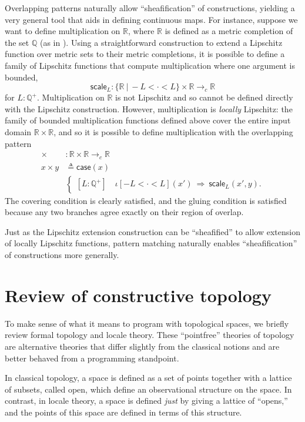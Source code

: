 \documentclass[conference]{IEEEtran}
\newcommand{\cto}{\to_c}
\newcommand{\R}{\mathbb{R}}
\newcommand{\rat}{\mathbb{Q}}
\newcommand{\suchthat}{\ |\ }
\newcommand{\oinclf}[1]{\iota[{#1}]}
\newcommand{\oincl}[2]{\oinclf{#1} \left({#2}\right)}
\newcommand{\Branch}{\Rightarrow}
\begin{document}
Overlapping patterns naturally allow ``sheafification'' of constructions, yielding a very general tool that aids in defining continuous maps. For instance, suppose we want to define multiplication on $\R$, where $\R$ is defined as a metric completion of the set $\rat$ (as in \cite{vickersmetric}). Using a straightforward construction to extend a Lipschitz function over metric sets to their metric completions, it is possible to define a family of Lipschitz functions that compute multiplication where one argument is bounded,
\[
\mathsf{scale}_L : \{ \R \suchthat -L < \cdot < L \} \times \R \cto \R
\]
for $L : \rat^+$. Multiplication on $\R$ is not Lipschitz and so cannot be defined directly with the Lipschitz construction. However, multiplication is \emph{locally} Lipschitz: the family of bounded multiplication functions defined above cover the entire input domain $\R \times \R$, and so it is possible to define multiplication with the overlapping pattern
\begin{align*}
\times &: \R \times \R \cto \R
\\ x \times y &\triangleq
\mathsf{case}(x)
\\
&\begin{cases}
[L : \rat^+] \quad \oincl{-L < \cdot < L}{x'}  \  \Branch \  \mathsf{scale}_L(x', y).
\end{cases}
\end{align*}
The covering condition is clearly satisfied, and the gluing condition is satisfied because any two branches agree exactly on their region of overlap.

Just as the Lipschitz extension construction can be ``sheafified'' to allow extension of locally Lipschitz functions, pattern matching naturally enables ``sheafification'' of constructions more generally.

\section{Review of constructive topology}
\label{s:topology}

To make sense of what it means to program with topological spaces, we briefly review formal topology and locale theory. These ``pointfree'' theories of topology are alternative theories that differ slightly from the classical notions and are better behaved from a programming standpoint.

In classical topology, a space is defined as a set of points together with a lattice of subsets, called open, which define an observational structure on the space. In contrast, in locale theory, a space is defined \emph{just} by giving a lattice of ``opens,'' and the points of this space are defined in terms of this structure.
\end{document}
